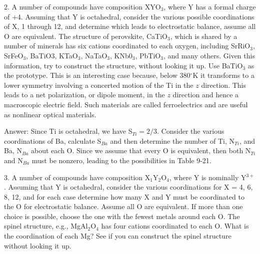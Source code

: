 \item {2.} A number of compounds have composition XYO$_3$, where Y has 
a formal charge of +4.  Assuming that Y is octahedral, consider the 
various possible coordinations of X, 1 through 12, and determine which 
leads to electrostatic balance, assume all O are equivalent. The
structure of perovskite, CaTiO$_3$, which is shared by a number of 
minerals has six cations coordinated to each oxygen,  including
SrRiO$_3$, SrFeO$_3$, BaTiO3, KTaO$_3$, NaTaO$_3$, KNb0$_3$, PbTiO$_3$, 
and many others.  Given this information, try to construct the 
structure, without looking it up.  Use BaTiO$_3$ as the prototype. This is an 
interesting case because, below 380$^{\circ}$K it transforms to a lower 
symmetry involving a concerted motion of the Ti in the $z$
direction.  This leads to a net polarization, or dipole moment, in 
the $z$ direction and hence a macroscopic electric field.  Such materials 
are called ferroelectrics and are useful as nonlinear optical materials.

\item { } Answer: Since Ti is octahedral, we have S$_{Ti} = 2/3$.  Consider 
the various coordinations of Ba, calculate S$_{Ba}$ and then determine the 
number of Ti, N$_{Ti}$, and Ba, N$_{Ba}$ about each O. Since we assume that 
every O is equivalent, then both N$_{Ti}$ and N$_{Ba}$ must be
nonzero, leading to the possibilities in Table 9-21.

\item {3.}	A number of compounds have composition X$_1$Y$_2$O$_4$, where Y 
is nominally Y$^{3+}$.  Assuming that Y is octahedral, consider the various 
coordinations for X = 4, 6, 8, 12, and for each case determine how many X 
and Y must be coordinated to the O for electrostatic balance.  Assume all
O are equivalent. If more than one choice is possible, choose the one 
with the fewest metals around each O.  The spinel structure, e.g., 
MgAl$_2$O$_4$ has four cations coordinated to each O.  What is the 
coordination of each Mg?  See if you can construct the spinel
structure without looking it up.
\vfill\eject

\baselineskip=14pt
